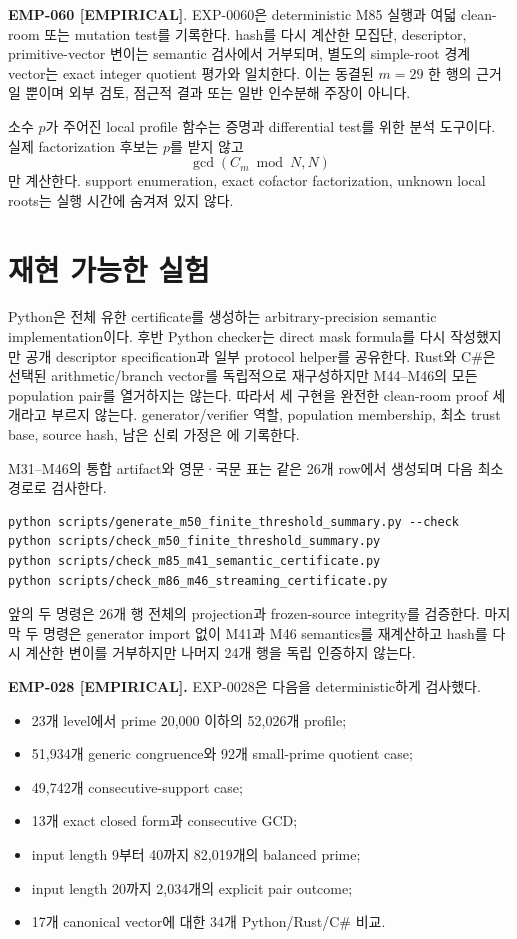 \documentclass[11pt]{article}
\newcommand{\claimstatus}[2]{\textbf{#1 [#2]}}
\begin{document}
\claimstatus{EMP-060}{EMPIRICAL}. EXP-0060은 deterministic M85 실행과
여덟 clean-room 또는 mutation test를 기록한다. hash를 다시 계산한
모집단, descriptor, primitive-vector 변이는 semantic 검사에서
거부되며, 별도의 simple-root 경계 vector는 exact integer quotient
평가와 일치한다. 이는 동결된 \(m=29\) 한 행의 근거일 뿐이며 외부
검토, 점근적 결과 또는 일반 인수분해 주장이 아니다.

소수 \(p\)가 주어진 local profile 함수는 증명과 differential test를
위한 분석 도구이다. 실제 factorization 후보는 \(p\)를 받지 않고
\[
\gcd(C_m\bmod N,N)
\]
만 계산한다. support enumeration, exact cofactor factorization,
unknown local roots는 실행 시간에 숨겨져 있지 않다.

\section{재현 가능한 실험}

Python은 전체 유한 certificate를 생성하는 arbitrary-precision semantic
implementation이다. 후반 Python checker는 direct mask formula를 다시
작성했지만 공개 descriptor specification과 일부 protocol helper를
공유한다. Rust와 C\#은 선택된 arithmetic/branch vector를 독립적으로
재구성하지만 M44--M46의 모든 population pair를 열거하지는 않는다.
따라서 세 구현을 완전한 clean-room proof 세 개라고 부르지 않는다.
generator/verifier 역할, population membership, 최소 trust base,
source hash, 남은 신뢰 가정은
에 기록한다.

M31--M46의 통합 artifact와 영문·국문 표는 같은 26개 row에서 생성되며
다음 최소 경로로 검사한다.

\begin{verbatim}
python scripts/generate_m50_finite_threshold_summary.py --check
python scripts/check_m50_finite_threshold_summary.py
python scripts/check_m85_m41_semantic_certificate.py
python scripts/check_m86_m46_streaming_certificate.py
\end{verbatim}
앞의 두 명령은 26개 행 전체의 projection과 frozen-source integrity를
검증한다. 마지막 두 명령은 generator import 없이 M41과 M46 semantics를
재계산하고 hash를 다시 계산한 변이를 거부하지만 나머지 24개 행을
독립 인증하지 않는다.

\textbf{EMP-028 [EMPIRICAL].}
EXP-0028은 다음을 deterministic하게 검사했다.

\begin{itemize}
\item 23개 level에서 prime 20,000 이하의 52,026개 profile;
\item 51,934개 generic congruence와 92개 small-prime quotient case;
\item 49,742개 consecutive-support case;
\item 13개 exact closed form과 consecutive GCD;
\item input length 9부터 40까지 82,019개의 balanced prime;
\item input length 20까지 2,034개의 explicit pair outcome;
\item 17개 canonical vector에 대한 34개 Python/Rust/C\# 비교.
\end{itemize}
\end{document}
